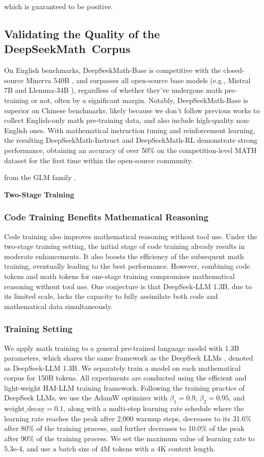 which is guaranteed to be positive.

\subsection{Validating the Quality of the DeepSeekMath~Corpus}

    On English benchmarks, DeepSeekMath-Base is competitive with the closed-source Minerva 540B \citep{minerva}, and surpasses all open-source base models (e.g., Mistral 7B \citep{mistral} and Llemma-34B \citep{llemma}), regardless of whether they've undergone math pre-training or not, often by a significant margin. Notably, DeepSeekMath-Base is superior on Chinese benchmarks, likely because we don't follow previous works \citep{minerva,llemma} to collect English-only math pre-training data, and also include high-quality non-English ones. With mathematical instruction tuning and reinforcement learning, the resulting DeepSeekMath-Instruct and DeepSeekMath-RL demonstrate strong performance, obtaining an accuracy of over 50\% on the competition-level MATH dataset for the first time within the open-source community.

    from the GLM family \citep{glm}.

\textbf{Two-Stage Training}

\subsubsection{Code Training Benefits Mathematical Reasoning}

Code training also improves mathematical reasoning without tool use. Under the two-stage training setting, the initial stage of code training already results in moderate enhancements. It also boosts the efficiency of the subsequent math training, eventually leading to the best performance. However, combining code tokens and math tokens for one-stage training compromises mathematical reasoning without tool use. One conjecture is that DeepSeek-LLM 1.3B, due to its limited scale, lacks the capacity to fully assimilate both code and mathematical data simultaneously.

\subsubsection{Training Setting}
\label{sec:quality-policy}
We apply math training to a general pre-trained language model with 1.3B parameters, which shares the same framework as the DeepSeek LLMs \citep{deepseek-llm}, denoted as DeepSeek-LLM 1.3B. We separately train a model on each mathematical corpus for 150B tokens. All experiments are conducted using the efficient and light-weight HAI-LLM \citep{haillm} training framework. Following the training practice of DeepSeek LLMs, we use the AdamW optimizer \citep{adamW} with $\beta_1=0.9$, $\beta_2=0.95$, and $\mathrm{weight\_decay}=0.1$, along with a multi-step learning rate schedule where the learning rate reaches the peak after 2,000 warmup steps, decreases to its 31.6\% after 80\% of the training process, and further decreases to 10.0\% of the peak after 90\% of the training process. We set the maximum value of learning rate to 5.3e-4, and use a batch size of 4M tokens with a 4K context length.

